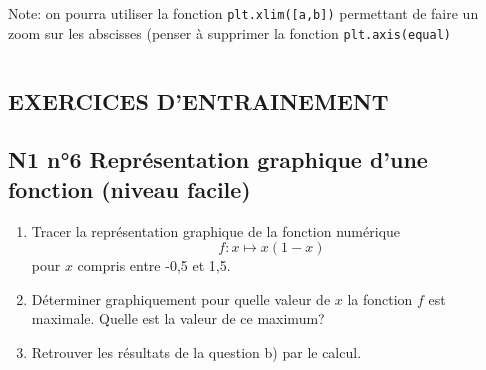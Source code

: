 \documentclass[11pt]{article}
\makeatletter
\newcommand{\boxspacing}{\kern\kvtcb@left@rule\kern\kvtcb@boxsep}
\newcommand{\prompt}[4]{
        \ttfamily\llap{{\color{#2}[#3]:\hspace{3pt}#4}}\vspace{-\baselineskip}
    }
\makeatother
\begin{document}
Note: on pourra utiliser la fonction \texttt{plt.xlim({[}a,b{]})}
permettant de faire un zoom sur les abscisses (penser à supprimer la
fonction \texttt{plt.axis(\textquotesingle{}equal\textquotesingle{})}

    \begin{tcolorbox}[breakable, size=fbox, boxrule=1pt, pad at break*=1mm,colback=cellbackground, colframe=cellborder]
\prompt{In}{incolor}{ }{\boxspacing}
\begin{Verbatim}[commandchars=\\\{\}]

\end{Verbatim}
\end{tcolorbox}

    \hypertarget{exercices-dentrainement}{%
\subsection{EXERCICES D'ENTRAINEMENT}\label{exercices-dentrainement}}

    \hypertarget{n1-n6-repruxe9sentation-graphique-dune-fonction-niveau-facile}{%
\subsection{N1 n°6 Représentation graphique d'une fonction (niveau
facile)}\label{n1-n6-repruxe9sentation-graphique-dune-fonction-niveau-facile}}

\begin{enumerate}
\def\labelenumi{\alph{enumi})}
\item
  Tracer la représentation graphique de la fonction numérique
  \[f : x\mapsto x(1-x)\] pour \(x\) compris entre -0,5 et 1,5.
\item
  Déterminer graphiquement pour quelle valeur de \(x\) la fonction \(f\)
  est maximale. Quelle est la valeur de ce maximum?
\item
  Retrouver les résultats de la question b) par le calcul.
\end{enumerate}
\end{document}
